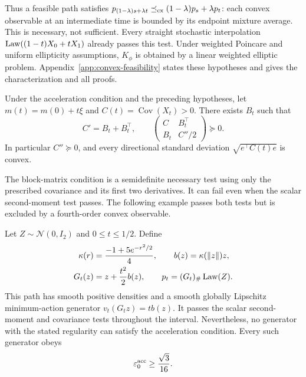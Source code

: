 Thus a feasible path satisfies
$p_{(1-\lambda)s+\lambda t}\preceq_{\rm cx}(1-\lambda)p_s+\lambda p_t$:
each convex observable at an intermediate time is bounded by its endpoint
mixture average.  This is necessary, not sufficient.  Every straight
stochastic interpolation $\operatorname{Law}((1-t)X_0+tX_1)$ already passes this test.
Under weighted Poincare and uniform ellipticity assumptions, $K_\phi$
is obtained by a linear weighted elliptic problem.
Appendix~\ref{app:convex-feasibility} states these hypotheses and gives
the characterization and all proofs.

\begin{proposition}
\label{prop:matrix-feasibility}
Under the acceleration condition and the preceding hypotheses, let
$m(t)=m(0)+t\xi$ and $C(t)=\operatorname{Cov}(X_t)>0$.  There exists $B_t$
such that
\begin{equation}
 C'=B_t+B_t^\top,\qquad
 \begin{pmatrix}C&B_t^\top\\ B_t&C''/2\end{pmatrix}\succeq0.
 \label{eq:covariance-lmi}
\end{equation}
In particular $C''\succeq0$, and every directional standard deviation
$\sqrt{e^\top C(t)e}$ is convex.
\end{proposition}

The block-matrix condition is a semidefinite necessary test using only
the prescribed covariance and its first two derivatives.  It can fail
even when the scalar second-moment test passes.  The following example
passes both tests but is excluded by a fourth-order convex observable.

\begin{proposition}
\label{prop:quartic-obstruction}
Let $Z\sim\mathcal N(0,I_2)$ and $0\le t\le1/2$.  Define
\begin{equation}
 \begin{split}
 \kappa(r)&=\frac{-1+5e^{-r^2/2}}4,\qquad b(z)=\kappa(\|z\|)z,\\
 G_t(z)&=z+\frac{t^2}{2}b(z),\qquad p_t=(G_t)_\#\operatorname{Law}(Z).
 \end{split}
 \label{eq:quartic-obstruction-path}
\end{equation}
This path has smooth positive densities and a smooth globally Lipschitz
minimum-action generator $v_t(G_tz)=t b(z)$.  It passes the scalar
second-moment and covariance tests throughout the interval.  Nevertheless,
no generator with the stated regularity can satisfy the acceleration
condition.  Every such generator obeys
\begin{equation}
 \varepsilon_0^{\rm acc}\ge\frac{\sqrt3}{16}.
 \label{eq:quartic-floor}
\end{equation}
\end{proposition}

